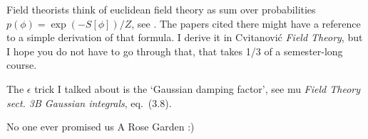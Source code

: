 \begin{description}
Field theorists think of euclidean field theory as sum over probabilities
\(p(\phi)=\exp(-S[\phi])/Z\), see . The papers
cited there might have a reference to a simple derivation of that
formula. I derive it in Cvitanovi{\'c} {\em Field Theory},
but I hope you do not have to go through that, that takes 1/3 of a
semester-long course.

The $\epsilon$ trick I talked about is the `Gaussian damping factor',
see mu {\em Field Theory}
{\em sect. 3B Gaussian integrals}, eq.~(3.8).




\end{description}
No one ever promised us
 {A Rose Garden} :)

\renewcommand{\ssp}{\ensuremath{x}}             %
\renewcommand{\Ssym}[1]{{\ensuremath{s_{#1}}}}    %

\printbibliography[heading=subbibintoc,title={References}]
